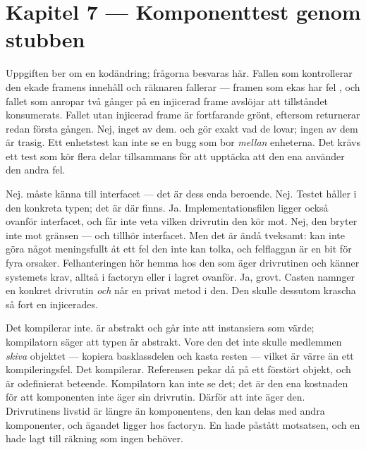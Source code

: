 \section*{Kapitel 7 --- Komponenttest genom stubben}

Uppgiften ber om en kodändring; frågorna besvaras här.
 Fallen som kontrollerar den ekade framens innehåll och räknaren fallerar --- framen som
ekas har fel , och fallet som anropar  två gånger på en injicerad frame
avslöjar att tillståndet konsumerats. Fallet utan injicerad frame är fortfarande grönt, eftersom
 returnerar  redan första gången.
 Nej, inget av dem.  och  gör exakt vad de lovar; ingen av dem är
trasig.
 Ett enhetstest kan inte se en bugg som bor \emph{mellan} enheterna. Det krävs ett test som
kör flera delar tillsammans för att upptäcka att den ena använder den andra fel.

 Nej.  måste känna till interfacet --- det är dess enda beroende.
 Nej. Testet håller i den konkreta typen; det är där  finns.
 Ja. Implementationsfilen ligger också ovanför interfacet, och får inte veta vilken
drivrutin den kör mot.
 Nej, den bryter inte mot gränsen ---  och  tillhör
interfacet. Men det är ändå tveksamt:  kan inte göra något meningsfullt åt ett fel
den inte kan tolka, och felflaggan är en bit för fyra orsaker. Felhanteringen hör hemma hos den
som äger drivrutinen och känner systemets krav, alltså i factoryn eller i lagret ovanför.
 Ja, grovt. Casten namnger en konkret drivrutin \emph{och} når en privat metod i den. Den
skulle dessutom krascha så fort en  injicerades.

 Det kompilerar inte.  är abstrakt och går inte att instansiera som värde;
kompilatorn säger att typen är abstrakt. Vore den det inte skulle medlemmen \emph{skiva} objektet
--- kopiera basklassdelen och kasta resten --- vilket är värre än ett kompileringsfel.
 Det kompilerar. Referensen pekar då på ett förstört objekt, och  är odefinierat
beteende. Kompilatorn kan inte se det; det är den ena kostnaden för att komponenten inte äger sin
drivrutin.
 Därför att  inte äger den. Drivrutinens livstid är längre än komponentens,
den kan delas med andra komponenter, och ägandet ligger hos factoryn. En  hade
påstått motsatsen, och en  hade lagt till räkning som ingen behöver.

